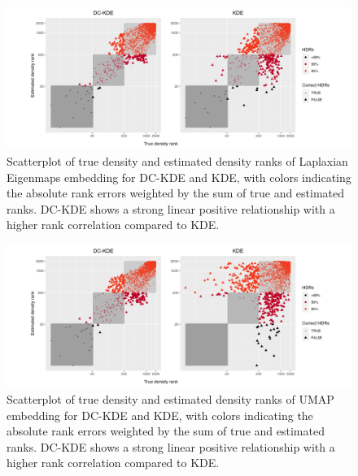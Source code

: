 \documentclass[11pt,a4paper,]{article}
\begin{document}
\begin{figure}

{\centering \includegraphics[width=1\linewidth]{figures/Twin Peak2000_densityrank_comparison_le_radius8_r0_5_logrank_rec_colprob_smallblocks3_crossfalse} 

}

\caption{Scatterplot of true density and estimated density ranks of Laplaxian Eigenmaps embedding for DC-KDE and KDE, with colors indicating the absolute rank errors weighted by the sum of true and estimated ranks. DC-KDE shows a strong linear positive relationship with a higher rank correlation compared to KDE.}\label{fig:tpleden}
\end{figure}

\begin{figure}

{\centering \includegraphics[width=1\linewidth]{figures/Twin Peak2000_densityrank_comparison_umap_radius8_r0_5_logrank_rec_colprob_smallblocks3_crossfalse} 

}

\caption{Scatterplot of true density and estimated density ranks of UMAP embedding for DC-KDE and KDE, with colors indicating the absolute rank errors weighted by the sum of true and estimated ranks. DC-KDE shows a strong linear positive relationship with a higher rank correlation compared to KDE.}\label{fig:tpumapden}
\end{figure}
\end{document}
